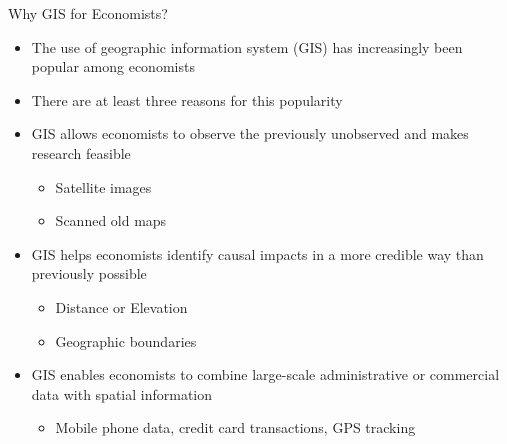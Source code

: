 \documentclass[hyperref={pdfpagelabels=false}]{beamer}
\begin{document}


\begin{frame}{Why GIS for Economists?}{}
\begin{itemize}
	\item The use of geographic information system (GIS) has
	increasingly been popular among economists
	\vspace{0.2cm}
	\item There are at least three reasons for this popularity
	\vspace{0.2cm}
	\item[1] GIS allows economists to observe the previously unobserved
	and makes research feasible
	\vspace{0.2cm}
	\begin{itemize}
		\item Satellite images
		\vspace{0.2cm}
		\item Scanned old maps
		\vspace{0.2cm}
	\end{itemize}
	\item[2] GIS helps economists identify causal impacts in a more credible way than previously possible
	\begin{itemize}
		\vspace{0.2cm}
		\item Distance or Elevation
		\vspace{0.2cm}
		\item Geographic boundaries
	\end{itemize}
	\vspace{0.2cm}
	\item[3] GIS enables economists to combine large-scale administrative or commercial data with spatial information
	\begin{itemize}
		\vspace{0.2cm}
		\item Mobile phone data, credit card transactions, GPS tracking
	\end{itemize}
\end{itemize}
\end{frame}
\end{document}
